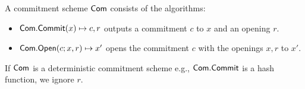 %
%





\begin{definition}
	A commitment scheme $ \mathsf{Com} $ consists of the algorithms:
	\begin{itemize}
		\item $ \mathsf{Com}.\mathsf{Commit}(x) \mapsto c,r$ outputs a commitment $ c $ to $ x $ and  an opening $ r $.
		\item $ \mathsf{Com}.\mathsf{Open}(c;x,r)  \mapsto x'$ opens the commitment $ c $ with the openings $ x,r$ to $ x' $. 
	\end{itemize}
\end{definition}

If $ \mathsf{Com} $ is a deterministic commitment scheme e.g., $ \mathsf{Com}.\mathsf{Commit} $ is a hash function, we ignore $ r $.





